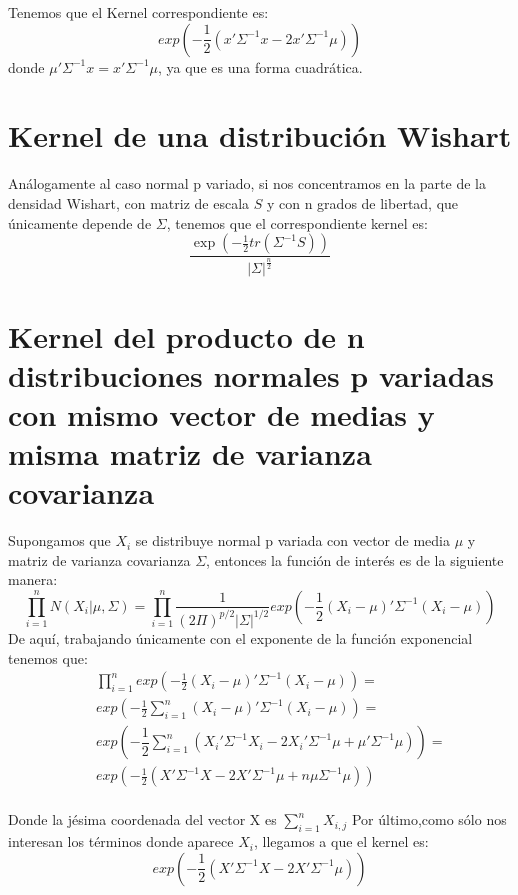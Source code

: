 Tenemos que el Kernel correspondiente es:
\begin{equation*}
exp(-\dfrac{1}{2}(x'\Sigma^{-1}x -2x'\Sigma^{-1}\mu))
\end{equation*}
donde $\mu'\Sigma^{-1}x=x'\Sigma^{-1}\mu$, ya que es una forma cuadrática.

\section{Kernel de una distribución Wishart}
Análogamente al caso normal p variado, si nos concentramos en la parte de la densidad Wishart, con matriz de escala $S$ y con n grados de libertad, que únicamente depende de $\Sigma$, tenemos que el correspondiente kernel es:
\begin{equation*}
\dfrac{\exp(-\frac{1}{2}tr(\Sigma^{-1}S))}{|\Sigma|^{\frac{n}{2}}}
\end{equation*}

\section{Kernel del producto de n distribuciones normales p variadas con mismo vector de medias y misma matriz de varianza covarianza}
Supongamos que $X_{i}$ se distribuye normal p variada con vector de media $\mu$ y matriz de varianza covarianza $\Sigma$, entonces la función de  interés es de la siguiente manera:
\begin{equation*}
\prod_{i=1}^{n}N(X_{i}|\mu,\Sigma)=\prod_{i=1}^{n}\dfrac{1}{(2\Pi)^{p/2}|\Sigma|^{1/2}}exp(-\frac{1}{2}(X_{i}-\mu)'\Sigma^{-1}(X_{i}-\mu))
\end{equation*}
De aquí, trabajando únicamente con el exponente de la función exponencial tenemos que:
\begin{eqnarray*}
& &\prod_{i=1}^{n}exp(-\frac{1}{2}(X_{i}-\mu)'\Sigma^{-1}(X_{i}-\mu))= \\
& &exp(-\frac{1}{2}\sum_{i=1}^{n} (X_{i}-\mu)'\Sigma^{-1}(X_{i}-\mu))= \\
& &exp(-\dfrac{1}{2}\sum_{i=1}^{n}(X_{i}'\Sigma^{-1}X_{i}-2X_{i}'\Sigma^{-1}\mu+\mu'\Sigma^{-1}\mu))= \\
& &exp(-\frac{1}{2}(X'\Sigma^{-1}X-2X'\Sigma^{-1}\mu+n\mu\Sigma^{-1}\mu))
 \\
\end{eqnarray*}

Donde la jésima coordenada del vector X es $\sum_{i=1}^{n}X_{i,j}$
Por último,como sólo nos interesan los términos donde aparece $X_{i}$, llegamos a que el kernel es:
\begin{equation*}
exp(-\frac{1}{2}(X'\Sigma^{-1}X-2X'\Sigma^{-1}\mu))
\end{equation*} 

